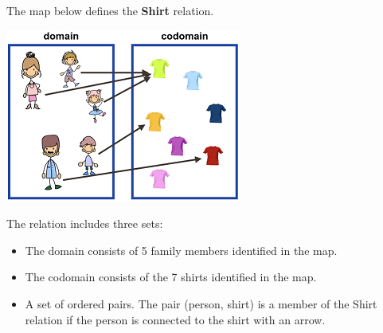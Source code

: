 \documentclass{ximera}
\begin{document}
\begin{definition}
  The map below defines the \textbf{Shirt} relation.
  
  

    \includegraphics[width=293px,height=215px]{pics/r1.png}

  
 

  The  relation includes three sets:
    \begin{itemize}
    \item The domain consists of 5 family members identified in the map.
    \item The codomain consists of the 7 shirts identified in the map.
    \item A set of ordered pairs. The pair (person, shirt) is a member of the Shirt relation if the person is connected to the shirt with an arrow.
    \end{itemize}

  
\end{definition}
\end{document}
